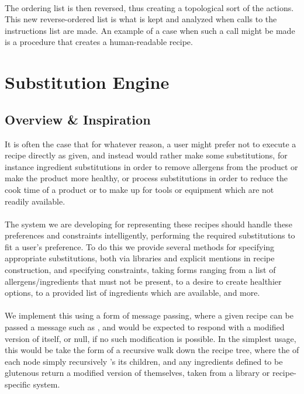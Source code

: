 \paragraph{}
The ordering list is then reversed, thus creating a topological sort of the actions. This new reverse-ordered list is what is kept and analyzed when calls to the instructions list are made. An example of a case when such a call might be made is a procedure that creates a human-readable recipe.

\newpage
\section{Substitution Engine}
\subsection{Overview \& Inspiration}
It is often the case that for whatever reason, a user might prefer not to execute a recipe directly as given, and instead would rather make some substitutions, for instance ingredient substitutions in order to remove allergens from the product or make the product more healthy, or process substitutions in order to reduce the cook time of a product or to make up for tools or equipment which are not readily available.

\paragraph{}
The system we are developing for representing these recipes should handle these preferences and constraints intelligently, performing the required substitutions to fit a user's preference. To do this we provide several methods for specifying appropriate substitutions, both via libraries and explicit mentions in recipe construction, and specifying constraints, taking forms ranging from a list of allergens/ingredients that must not be present, to a desire to create healthier options, to a provided list of ingredients which are available, and more.

\paragraph{}
We implement this using a form of message passing, where a given recipe can be passed a message such as , and would be expected to respond with a modified version of itself, or null, if no such modification is possible. In the simplest usage, this would be take the form of a recursive walk down the recipe tree, where the  of each node simply recursively 's its children, and any ingredients defined to be glutenous return a modified version of themselves, taken from a library or recipe-specific  system.

